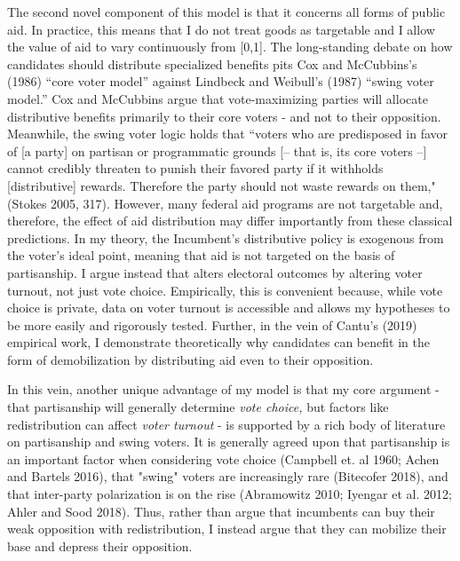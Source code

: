 \documentclass[12pt]{paper}
\begin{document}
The second novel component of this model is that it concerns all forms of public aid. In practice, this means that I do not treat goods as targetable and I allow the value of aid to vary continuously from [0,1]. The long-standing debate on how candidates should distribute specialized benefits pits Cox and McCubbins's (1986) ``core voter model” against Lindbeck and Weibull's (1987) ``swing voter model.” Cox and McCubbins argue that vote-maximizing parties will allocate distributive benefits primarily to their core voters - and not to their opposition. Meanwhile, the swing voter logic holds that ``voters who are predisposed in favor of [a party] on partisan or programmatic grounds [– that is, its core voters –] cannot credibly threaten to punish their favored party if it withholds [distributive] rewards. Therefore the party should not waste rewards on them," (Stokes 2005, 317). However, many federal aid programs are not targetable and, therefore, the effect of aid distribution may differ importantly from these classical predictions. In my theory, the Incumbent's distributive policy is exogenous from the voter's ideal point, meaning that aid is not targeted on the basis of partisanship. I argue instead that alters electoral outcomes by altering voter turnout, not just vote choice. Empirically, this is convenient because, while vote choice is private, data on voter turnout is  accessible and allows my hypotheses to be more easily and rigorously tested. Further, in the vein of Cantu's (2019) empirical work, I demonstrate theoretically why candidates can benefit in the form of demobilization by distributing aid even to their opposition.

In this vein, another unique advantage of my model is that my core argument - that partisanship will generally determine \textit{vote choice,} but factors like redistribution can affect \textit{voter turnout} - is supported by a rich body of literature on partisanship and swing voters. It is generally agreed upon that partisanship is an important factor when considering vote choice (Campbell et. al 1960; Achen and Bartels 2016), that "swing" voters are increasingly rare (Bitecofer 2018), and that inter-party polarization is on the rise (Abramowitz 2010; Iyengar et al. 2012; Ahler and Sood 2018). Thus, rather than argue that incumbents can buy their weak opposition with redistribution, I instead argue that they can mobilize their base and depress their opposition.
\end{document}
